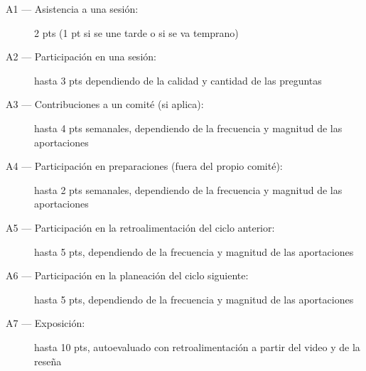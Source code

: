\begin{description}
\item[A1 --- Asistencia a una sesi\'{o}n:]{2 pts (1 pt si se une tarde o si se
    va temprano)}
\item[A2 --- Participaci\'{o}n en una sesi\'{o}n:]{hasta 3 pts dependiendo de la
    calidad y cantidad de las preguntas}
\item[A3 --- Contribuciones a un comit\'{e} (si aplica):]{hasta 4 pts
    semanales, dependiendo de la frecuencia y magnitud de las
    aportaciones}
\item[A4 --- Participaci\'{o}n en preparaciones (fuera del propio
  comit\'{e}):]{hasta 2 pts semanales, dependiendo de la frecuencia y
    magnitud de las aportaciones}
\item[A5 --- Participaci\'{o}n en la retroalimentaci\'{o}n del ciclo
  anterior:]{hasta 5 pts, dependiendo de la frecuencia y magnitud de
    las aportaciones}
\item[A6 --- Participaci\'{o}n en la planeaci\'{o}n del ciclo siguiente:]{hasta 5
    pts, dependiendo de la frecuencia y magnitud de las aportaciones}
\item[A7 --- Exposici\'{o}n:]{hasta 10 pts, autoevaluado con retroalimentaci\'{o}n a
    partir del video y de la rese\~{n}a}
\end{description}
  